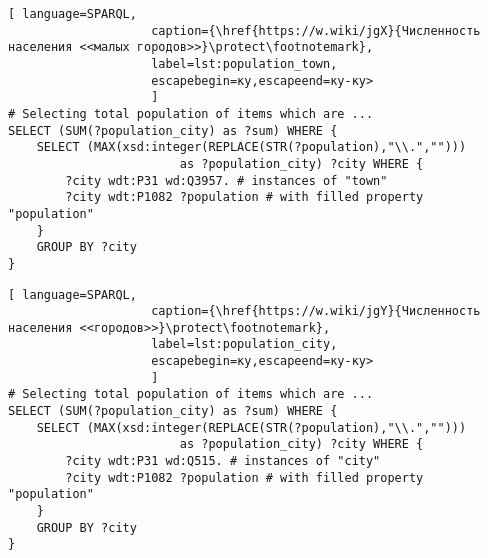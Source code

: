 \begin{lstlisting}[ language=SPARQL, 
                    caption={\href{https://w.wiki/jgX}{Численность населения <<малых городов>>}\protect\footnotemark},
                    label=lst:population_town, 
                    escapebegin=ку,escapeend=ку-ку>
                    ]
# Selecting total population of items which are ...
SELECT (SUM(?population_city) as ?sum) WHERE {                    
	SELECT (MAX(xsd:integer(REPLACE(STR(?population),"\\.",""))) 
						as ?population_city) ?city WHERE {
		?city wdt:P31 wd:Q3957.	# instances of "town"
		?city wdt:P1082 ?population # with filled property "population"                                  
	}
	GROUP BY ?city
}
\end{lstlisting}


\begin{lstlisting}[ language=SPARQL, 
                    caption={\href{https://w.wiki/jgY}{Численность населения <<городов>>}\protect\footnotemark},
                    label=lst:population_city, 
                    escapebegin=ку,escapeend=ку-ку>
                    ]
# Selecting total population of items which are ...
SELECT (SUM(?population_city) as ?sum) WHERE {                    
	SELECT (MAX(xsd:integer(REPLACE(STR(?population),"\\.",""))) 
						as ?population_city) ?city WHERE {
		?city wdt:P31 wd:Q515. # instances of "city"
		?city wdt:P1082 ?population # with filled property "population"
	}
	GROUP BY ?city
}\end{lstlisting}


